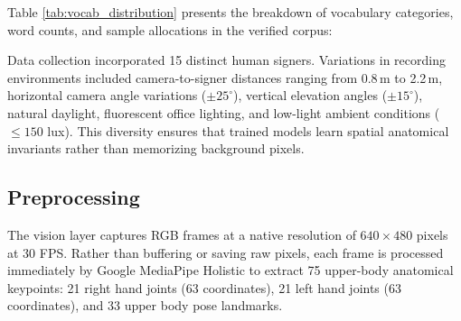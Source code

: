 Table \ref{tab:vocab_distribution} presents the breakdown of vocabulary categories, word counts, and sample allocations in the verified corpus:

\begin{table}[h]
\caption{Distribution of the 100-Word ISL-Lens Evaluation Corpus}
\label{tab:vocab_distribution}
\begin{center}
\end{center}
\end{table}

Data collection incorporated 15 distinct human signers. Variations in recording environments included camera-to-signer distances ranging from 0.8\,m to 2.2\,m, horizontal camera angle variations ($\pm 25^\circ$), vertical elevation angles ($\pm 15^\circ$), natural daylight, fluorescent office lighting, and low-light ambient conditions ($\le 150$ lux). This diversity ensures that trained models learn spatial anatomical invariants rather than memorizing background pixels.

\subsection{Preprocessing}
The vision layer captures RGB frames at a native resolution of $640 \times 480$ pixels at 30 FPS. Rather than buffering or saving raw pixels, each frame is processed immediately by Google MediaPipe Holistic \cite{2,3,4} to extract 75 upper-body anatomical keypoints: 21 right hand joints (63 coordinates), 21 left hand joints (63 coordinates), and 33 upper body pose landmarks.

